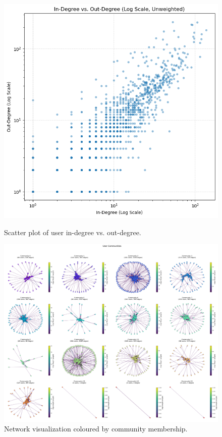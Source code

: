 \begin{figure}[h!]
    \begin{minipage}[b]{0.4\textwidth}
        \centering
        \includegraphics[width=\textwidth]{../inoutdegree.png}
        \caption{Scatter plot of user in-degree vs. out-degree.}
        \label{fig:in_out_corr}
    \end{minipage}
    \hfill
    \begin{minipage}[b]{0.45\textwidth}
        \centering
        \includegraphics[width=\textwidth]{../communities.png}
        \caption{Network visualization coloured by community membership.}
        \label{fig:community_visualization}
    \end{minipage}

\end{figure}


